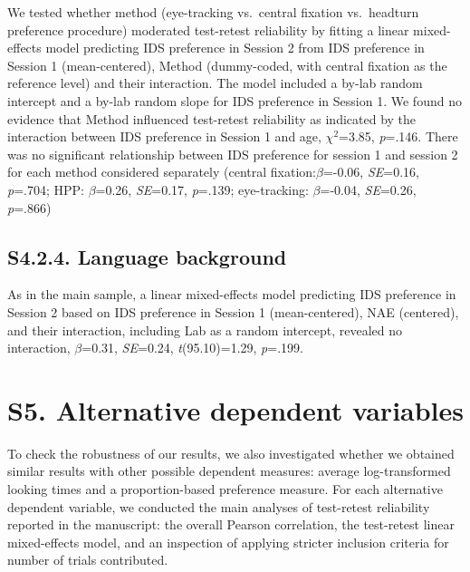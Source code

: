 \documentclass[
  man, donotrepeattitle,floatsintext]{apa6}
\begin{document}
We tested whether method (eye-tracking vs.~central fixation vs.~headturn preference procedure) moderated test-retest reliability by fitting a linear mixed-effects model predicting IDS preference in Session 2 from IDS preference in Session 1 (mean-centered), Method (dummy-coded, with central fixation as the reference level) and their interaction.
The model included a by-lab random intercept and a by-lab random slope for IDS preference in Session 1.
We found no evidence that Method influenced test-retest reliability as indicated by the interaction between IDS preference in Session 1 and age, \({\chi}^2\)=3.85, \emph{p}=.146. There was no significant relationship between IDS preference for session 1 and session 2 for each method considered separately (central fixation:\(\beta\)=-0.06, \emph{SE}=0.16, \emph{p}=.704; HPP: \(\beta\)=0.26, \emph{SE}=0.17, \emph{p}=.139; eye-tracking: \(\beta\)=-0.04, \emph{SE}=0.26, \emph{p}=.866)

\hypertarget{s4.2.4.-language-background}{%
\subsection{S4.2.4. Language background}\label{s4.2.4.-language-background}}

As in the main sample, a linear mixed-effects model predicting IDS preference in Session 2 based on IDS preference in Session 1 (mean-centered), NAE (centered), and their interaction, including Lab as a random intercept, revealed no interaction, \(\beta\)=0.31, \emph{SE}=0.24, \emph{t}(95.10)=1.29, \emph{p}=.199.

\newpage

\hypertarget{s5.-alternative-dependent-variables}{%
\section{S5. Alternative dependent variables}\label{s5.-alternative-dependent-variables}}

To check the robustness of our results, we also investigated whether we obtained similar results with other possible dependent measures: average log-transformed looking times and a proportion-based preference measure. For each alternative dependent variable, we conducted the main analyses of test-retest reliability reported in the manuscript: the overall Pearson correlation, the test-retest linear mixed-effects model, and an inspection of applying stricter inclusion criteria for number of trials contributed.
\end{document}
